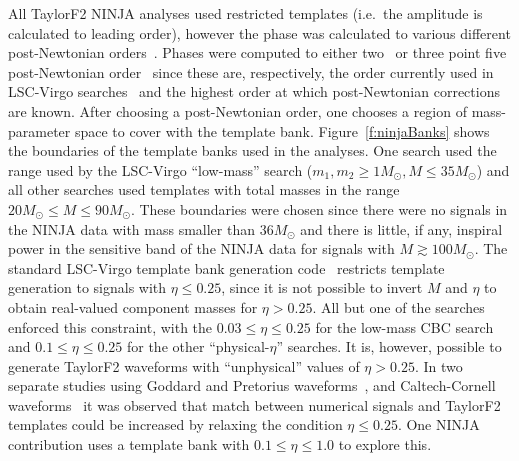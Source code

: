 All TaylorF2 NINJA analyses used restricted templates (i.e.~the amplitude is
calculated to leading order), however the phase was calculated to various
different post-Newtonian orders~\cite{Blanchet:2002av}. Phases were computed to
either two~\cite{Blanchet:1996pi,Blanchet:1995ez} or three point five
post-Newtonian order~\cite{Blanchet:2001ax,PhysRevD.71.129902,Blanchet:2004ek}
since these are, respectively, the order currently used in LSC-Virgo
searches~\cite{Abbott:2009tt} and the highest order at which post-Newtonian
corrections are known. After choosing a post-Newtonian order, one chooses a
region of mass-parameter space to cover with the template bank.
Figure~\ref{f:ninjaBanks} shows the boundaries of the template banks used in
the analyses. One search used the range used by the LSC-Virgo ``low-mass''
search \cite{Abbott:2009tt} ($m_1,m_2 \ge  1 M_\odot, M \le 35 M_{\odot}$) and
all other searches used templates with total masses in the range $20 M_\odot
\le M \le 90 M_\odot$.  These boundaries were chosen since there were no
signals in the NINJA data with mass smaller than $36 M_\odot$ and there is
little, if any, inspiral power in the sensitive band of the NINJA data for
signals with $M \gtrsim 100 M_\odot$.  The standard LSC-Virgo template bank
generation code~\cite{Babak:2006ty} restricts template generation to signals
with $\eta \le 0.25$, since it is not possible to invert $M$ and $\eta$ to
obtain real-valued component masses for $\eta > 0.25$. All but one of the
searches enforced this constraint, with the $0.03 \le \eta \le 0.25$ for the
low-mass CBC search and $0.1 \le \eta \le 0.25$ for the other
``physical-$\eta$'' searches. It is, however, possible to generate TaylorF2
waveforms with ``unphysical'' values of $\eta > 0.25$.  In two separate studies
using Goddard and Pretorius waveforms~\cite{Pan:2007nw}, and Caltech-Cornell
waveforms~\cite{Boyle:2009dg} it was observed that match between numerical
signals and TaylorF2 templates could be increased by relaxing the condition
$\eta \le 0.25$. One NINJA contribution uses a template bank with $0.1 \le \eta
\le 1.0$ to explore this.

